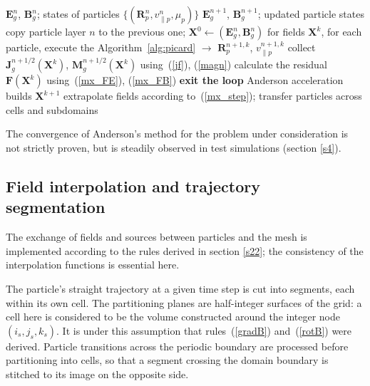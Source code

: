 \documentclass[final,3p]{elsarticle}
\begin{document}
\begin{algorithm}[H]
\caption{Outer loop (one time step)}
\label{alg:anderson}
\begin{algorithmic}[1]
\Require $\mathbf{E}_g^n$, $\mathbf{B}_g^n$; states of particles $\{(\mathbf{R}_p^n,v_{\|p}^n,\mu_p)\}$
\Ensure $\mathbf{E}_g^{n+1}$, $\mathbf{B}_g^{n+1}$; updated particle states
\State copy particle layer $n$ to the previous one; \enspace $\mathbf{X}^0\gets(\mathbf{E}_g^n,\mathbf{B}_g^n)$
    \State for fields $\mathbf{X}^k$, for each particle, execute the Algorithm~\ref{alg:picard} $\rightarrow$ $\mathbf{R}_p^{n+1,k}$, $v_{\|p}^{n+1,k}$
    \State collect $\mathbf{J}_g^{n+1/2}(\mathbf{X}^k)$, $\mathbf{M}_g^{n+1/2}(\mathbf{X}^k)$ using~(\ref{jf}), (\ref{magn}) 
    \State calculate the residual $\mathbf{F}(\mathbf{X}^k)$ using~(\ref{mx_FE}), (\ref{mx_FB})
     \State \textbf{exit the loop} \EndIf
    \State Anderson acceleration builds $\mathbf{X}^{k+1}$
\EndFor
\State extrapolate fields according to~(\ref{mx_step}); \enspace transfer particles across cells and subdomains
\end{algorithmic}
\end{algorithm}
 
The convergence of Anderson's method for the problem under consideration is not strictly proven, but is steadily observed in test simulations (section \ref{s4}).

\subsection{Field interpolation and trajectory segmentation}\label{imp:interp}

The exchange of fields and sources between particles and the mesh is implemented according to the rules derived in section \ref{s22}; the consistency of the interpolation functions is essential here.

The particle's straight trajectory at a given time step is cut into segments, each within its own cell. The partitioning planes are half-integer surfaces of the grid: a cell here is considered to be the volume constructed around the integer node $(i_s,j_s,k_s)$. It is under this assumption that rules~(\ref{gradB}) and~(\ref{rotB}) were derived. Particle transitions across the periodic boundary are processed before partitioning into cells, so that a segment crossing the domain boundary is stitched to its image on the opposite side.
\end{document}
